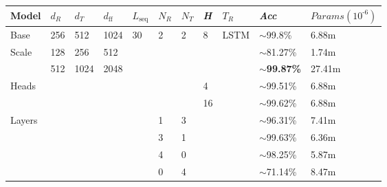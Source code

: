 \begin{table}[hbt!]
\begin{tabular}{lllllllllll}
\hline
\textbf{Model} & \textit{\(d_R\)} & \textit{\(d_T\)} & \textit{\(d_\text{ff}\)} & \textit{\(L_\text{seq}\)} & \textit{\(N_R\)} & \textit{\(N_T\)} & \textit{H} & \textit{\(T_R\)} & \textit{Acc}           & \textit{\(Params(10^\text{-6})\)} \\ \hline
Base           & 256           & 512           & 1024           & 30              & 2             & 2             & 8          & LSTM          & $\sim$99.8\%           & 6.88m                                   \\ \hline
Scale          & 128           & 256           & 512            &                 &               &               &            &               & $\sim$81.27\%          & 1.74m                                   \\
               & 512           & 1024          & 2048           &                 &               &               &            &               & \textbf{$\sim$99.87\%} & 27.41m                                        \\ \hline
Heads          &               &               &                &                 &               &               & 4          &               & $\sim$99.51\%          & 6.88m                                   \\
               &               &               &                &                 &               &               & 16         &               & $\sim$99.62\%          & 6.88m                                   \\ \hline
Layers         &               &               &                &                 & 1             & 3             &            &               & $\sim$96.31\%          & 7.41m                                   \\
               &               &               &                &                 & 3             & 1             &            &               & $\sim$99.63\%          & 6.36m                                   \\
               &               &               &                &                 & 4             & 0             &            &               & $\sim$98.25\%          & 5.87m                                   \\
               &               &               &                &                 & 0             & 4             &            &               & $\sim$71.14\%          & 8.47m                                   \\ \hline

\end{tabular}
\end{table}
